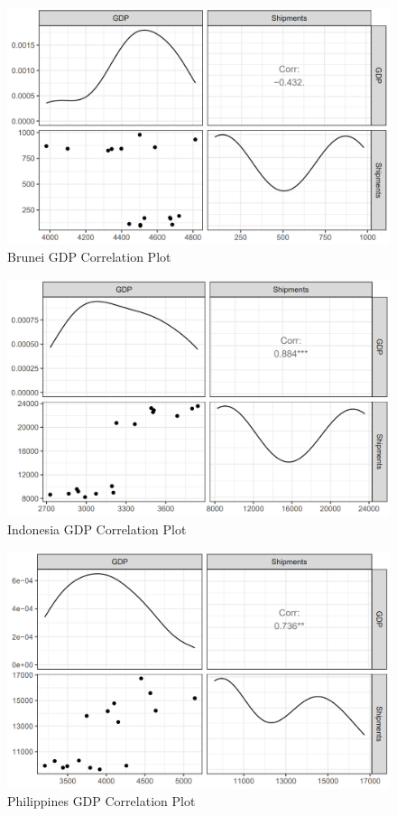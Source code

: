 \documentclass{article}
\begin{document}
\begin{figure}[H]
    \centering
    \includegraphics[width=1\textwidth]{images/Line Plots/Brunei/Brunei_Corrplot.png}
    \caption{Brunei GDP Correlation Plot}
    \label{fig:my_label}
\end{figure}

\begin{figure}[H]
    \centering
    \includegraphics[width=1\textwidth]{images/Line Plots/Indonesia/Indonesia_Corrplot.png}
    \caption{Indonesia GDP Correlation Plot}
    \label{fig:my_label}
\end{figure}

\begin{figure}[H]
    \centering
    \includegraphics[width=1\textwidth]{images/Line Plots/Philippines/Philippines_Corrplot.png}
    \caption{Philippines GDP Correlation Plot}
    \label{fig:my_label}
\end{figure}
\end{document}
